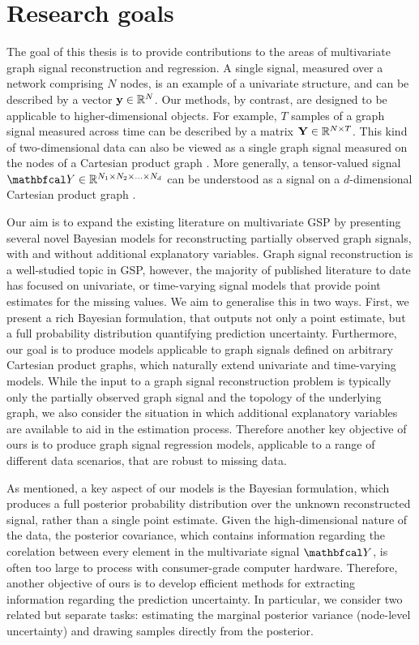 \section{Research goals}


The goal of this thesis is to provide contributions to the areas of multivariate graph signal reconstruction and regression. A single signal, measured over a network comprising $N$ nodes, is an example of a univariate structure, and can be described by a vector $\mathbf{y} \in \mathbb{R}^N$. Our methods, by contrast, are designed to be applicable to higher-dimensional objects. For example, $T$ samples of a graph signal measured across time can be described by a matrix $\mathbf{Y} \in \mathbb{R}^{N \times T}$. This kind of two-dimensional data can also be viewed as a single graph signal measured on the nodes of a Cartesian product graph \citep{Imrich2000}. More generally, a tensor-valued signal $\Yt \in \R^{N_1 \times N_2 \times ... \times N_d}$ can be understood as a signal on a $d$-dimensional Cartesian product graph \citep{Stanley2020}. 


Our aim is to expand the existing literature on multivariate GSP by presenting several novel Bayesian models for reconstructing partially observed graph signals, with and without additional explanatory variables. Graph signal reconstruction is a well-studied topic in GSP, however, the majority of published literature to date has focused on univariate, or time-varying signal models that provide point estimates for the missing values. We aim to generalise this in two ways. First, we present a rich Bayesian formulation, that outputs not only a point estimate, but a full probability distribution quantifying prediction uncertainty. Furthermore, our goal is to produce models applicable to graph signals defined on arbitrary Cartesian product graphs, which naturally extend univariate and time-varying models. While the input to a graph signal reconstruction problem is typically only the partially observed graph signal and the topology of the underlying graph, we also consider the situation in which additional explanatory variables are available to aid in the estimation process. Therefore another key objective of ours is to produce graph signal regression models, applicable to a range of different data scenarios, that are robust to missing data. 


As mentioned, a key aspect of our models is the Bayesian formulation, which produces a full posterior probability distribution over the unknown reconstructed signal, rather than a single point estimate. Given the high-dimensional nature of the data, the posterior covariance, which contains information regarding the corelation between every element in the multivariate signal $\Yt$, is often too large to process with consumer-grade computer hardware. Therefore, another objective of ours is to develop efficient methods for extracting information regarding the prediction uncertainty. In particular, we consider two related but separate tasks: estimating the marginal posterior variance (node-level uncertainty) and drawing samples directly from the posterior. 

